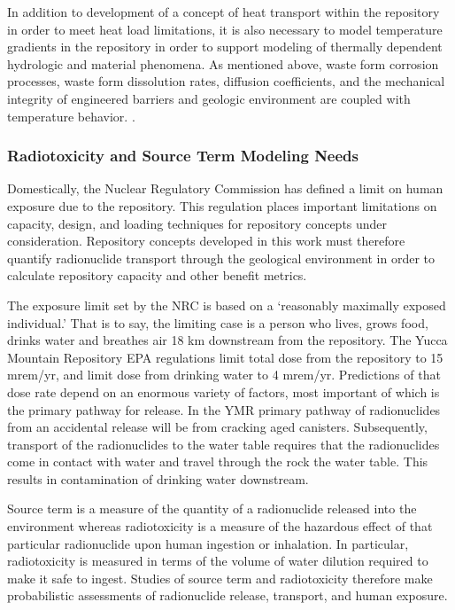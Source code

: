 In addition to development of a concept of heat transport within the repository 
in order to meet heat load limitations, it is also necessary to model 
temperature gradients in the repository in  order to support modeling of 
thermally dependent hydrologic and material phenomena.  As mentioned above, 
waste form corrosion processes, waste form
dissolution rates, diffusion coefficients, and the mechanical integrity of 
engineered barriers and geologic environment are coupled with temperature 
behavior.  \cite{andra_argile:_2005}. %


\subsubsection{Radiotoxicity and Source Term Modeling Needs}

Domestically, the Nuclear Regulatory Commission has defined a limit on  human 
exposure due to the repository. This regulation places important limitations on 
capacity, design, and loading techniques for repository concepts under 
consideration. Repository concepts developed in this work must therefore 
quantify radionuclide transport through the geological environment in order to 
calculate repository capacity and other benefit metrics. 

The exposure limit set by the NRC is based on a `reasonably maximally exposed 
individual.' That is to say, the limiting case is a person who lives, grows 
food, drinks water and breathes air 18 km downstream from the repository. The 
Yucca Mountain Repository \gls{EPA} regulations limit total dose from the 
repository to 15 mrem/yr, and limit dose from drinking water to 4 mrem/yr.  
Predictions of that dose rate depend on an enormous variety of factors, most 
important of which is the primary pathway for release. In the \gls{YMR} primary 
pathway of radionuclides from an accidental release will be from cracking aged 
canisters. Subsequently, transport of the radionuclides to the water table 
requires that the radionuclides come in contact with water and travel through 
the rock the water table. This results in contamination of drinking water 
downstream.  

Source term is a measure of the quantity of a radionuclide released into the 
environment whereas radiotoxicity is a measure of the hazardous effect of that 
particular radionuclide upon human ingestion or inhalation.  In particular, 
radiotoxicity is measured in terms of the volume of water dilution required to 
make it safe to ingest. Studies of source term and radiotoxicity therefore make 
probabilistic assessments of radionuclide release, transport, and human 
exposure.  

